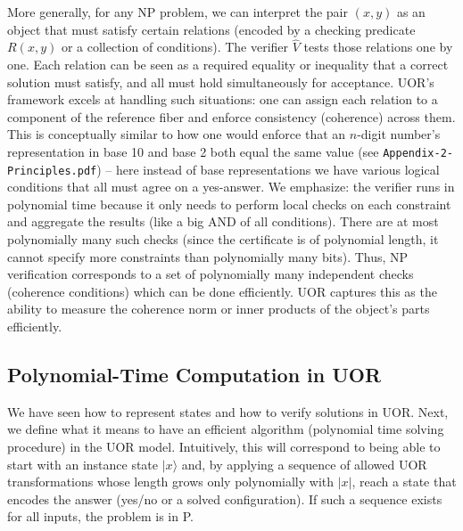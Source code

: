 \documentclass[11pt]{article}
\begin{document}
More generally, for any NP problem, we can interpret the pair \((x,y)\) as an object that must satisfy certain relations (encoded by a checking predicate \(R(x,y)\) or a collection of conditions). The verifier \(\hat{V}\) tests those relations one by one. Each relation can be seen as a required equality or inequality that a correct solution must satisfy, and all must hold simultaneously for acceptance. UOR’s framework excels at handling such situations: one can assign each relation to a component of the reference fiber and enforce consistency (coherence) across them. This is conceptually similar to how one would enforce that an \(n\)-digit number’s representation in base 10 and base 2 both equal the same value (see \texttt{Appendix-2-Principles.pdf}) -- here instead of base representations we have various logical conditions that all must agree on a yes-answer. We emphasize: the verifier runs in polynomial time because it only needs to perform local checks on each constraint and aggregate the results (like a big AND of all conditions). There are at most polynomially many such checks (since the certificate is of polynomial length, it cannot specify more constraints than polynomially many bits). Thus, NP verification corresponds to a set of polynomially many independent checks (coherence conditions) which can be done efficiently. UOR captures this as the ability to measure the coherence norm or inner products of the object’s parts efficiently.

\subsection{Polynomial-Time Computation in UOR}
We have seen how to represent states and how to verify solutions in UOR. Next, we define what it means to have an efficient algorithm (polynomial time solving procedure) in the UOR model. Intuitively, this will correspond to being able to start with an instance state \(|x\rangle\) and, by applying a sequence of allowed UOR transformations whose length grows only polynomially with \(|x|\), reach a state that encodes the answer (yes/no or a solved configuration). If such a sequence exists for all inputs, the problem is in P.
\end{document}
